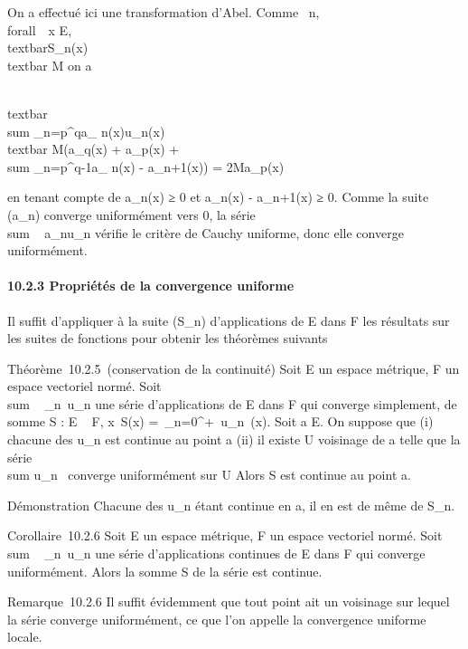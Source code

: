 \documentclass[]{article}
\begin{document}
On a effectué ici une transformation d'Abel. Comme
\forall~n, \\forall~~x \in E,
\\textbar{}S\_n(x)\\textbar{} \leq M
on a

\\textbar{}\\sum
\_n=p^qa\_
n(x)u\_n(x)\\textbar{} \leq
M(\textbar{}a\_q(x)\textbar{} +
\textbar{}a\_p(x)\textbar{} + \\sum
\_n=p^q-1\textbar{}a\_ n(x) -
a\_n+1(x)\textbar{}) = 2Ma\_p(x)

en tenant compte de a\_n(x) ≥ 0 et a\_n(x) -
a\_n+1(x) ≥ 0. Comme la suite (a\_n) converge
uniformément vers 0, la série
\\sum ~
a\_nu\_n vérifie le critère de Cauchy uniforme, donc
elle converge uniformément.

\paragraph{10.2.3 Propriétés de la convergence uniforme}

Il suffit d'appliquer à la suite (S\_n) d'applications de E dans
F les résultats sur les suites de fonctions pour obtenir les théorèmes
suivants

Théorème~10.2.5~(conservation de la continuité) Soit E un espace
métrique, F un espace vectoriel normé. Soit
\\sum ~
\_n\in{}~u\_n une série d'applications de E dans F qui
converge simplement, de somme S : E \rightarrow~ F,
x\mapsto~S(x) =\
\sum  \_n=0^+\infty~u\_n~(x).
Soit a \in E. On suppose que (i) chacune des u\_n est continue au
point a (ii) il existe U voisinage de a telle que la série
\\sum  u\_n~
converge uniformément sur U Alors S est continue au point a.

Démonstration Chacune des u\_n étant continue en a, il en est de
même de S\_n.

Corollaire~10.2.6 Soit E un espace métrique, F un espace vectoriel
normé. Soit \\sum ~
\_n\in{}~u\_n une série d'applications continues de E dans F
qui converge uniformément. Alors la somme S de la série est continue.

Remarque~10.2.6 Il suffit évidemment que tout point ait un voisinage sur
lequel la série converge uniformément, ce que l'on appelle la
convergence uniforme locale.
\end{document}
